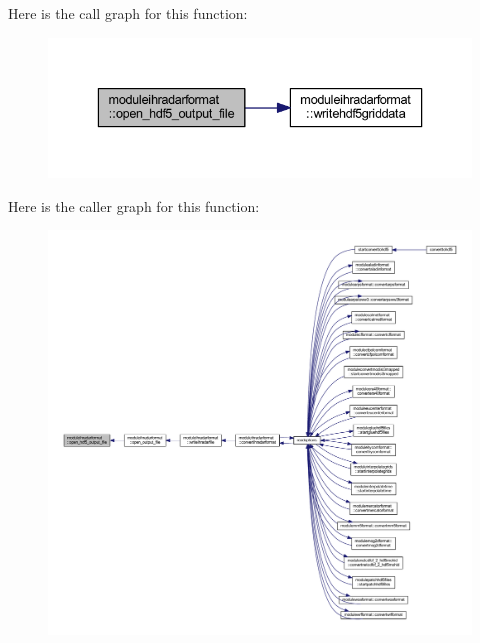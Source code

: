 Here is the call graph for this function\+:\nopagebreak
\begin{figure}[H]
\begin{center}
\leavevmode
\includegraphics[width=336pt]{namespacemoduleihradarformat_a923e50f44a04ab5c716a0a2526b165e1_cgraph}
\end{center}
\end{figure}
Here is the caller graph for this function\+:\nopagebreak
\begin{figure}[H]
\begin{center}
\leavevmode
\includegraphics[width=350pt]{namespacemoduleihradarformat_a923e50f44a04ab5c716a0a2526b165e1_icgraph}
\end{center}
\end{figure}
\mbox{\label{namespacemoduleihradarformat_a26abbb9b22d84c708e9f26ef8003eff4}} 
